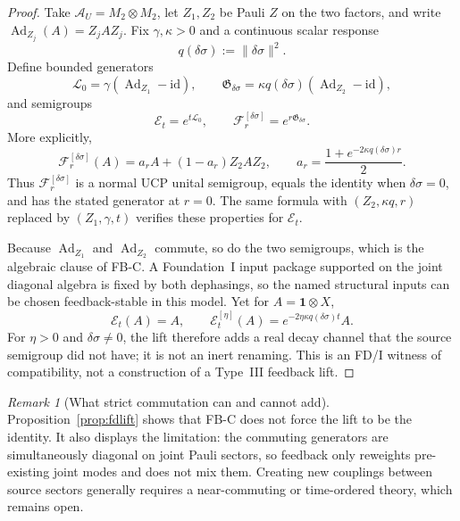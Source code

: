 \documentclass[12pt]{article}
\theoremstyle{definition}
\theoremstyle{remark}
\newtheorem{remark}[theorem]{Remark}
\begin{document}
\begin{proof}
Take \(\mathcal A_U=M_2\otimes M_2\), let \(Z_1,Z_2\) be Pauli \(Z\) on
the two factors, and write \(\operatorname{Ad}_{Z_j}(A)=Z_jAZ_j\). Fix
\(\gamma,\kappa>0\) and a continuous scalar response
\[
q(\delta\sigma):=\|\delta\sigma\|^2.
\]
Define bounded generators
\[
\mathcal L_0=\gamma(\operatorname{Ad}_{Z_1}-\mathrm{id}),
\qquad
\mathfrak G_{\delta\sigma}
=\kappa q(\delta\sigma)
(\operatorname{Ad}_{Z_2}-\mathrm{id}),
\]
and semigroups
\[
\mathcal E_t=e^{t\mathcal L_0},
\qquad
\mathscr F_r^{[\delta\sigma]}=e^{r\mathfrak G_{\delta\sigma}}.
\]
More explicitly,
\[
\mathscr F_r^{[\delta\sigma]}(A)
=a_r A+(1-a_r)Z_2AZ_2,
\qquad
a_r=\frac{1+e^{-2\kappa q(\delta\sigma)r}}{2}.
\]
Thus \(\mathscr F_r^{[\delta\sigma]}\) is a normal UCP unital
semigroup, equals the identity when \(\delta\sigma=0\), and has the
stated generator at \(r=0\). The same formula with
\((Z_2,\kappa q,r)\) replaced by \((Z_1,\gamma,t)\) verifies these
properties for \(\mathcal E_t\).

Because \(\operatorname{Ad}_{Z_1}\) and
\(\operatorname{Ad}_{Z_2}\) commute, so do the two semigroups, which is
the algebraic clause of FB-C. A Foundation~I input package supported on
the joint diagonal algebra is fixed by both dephasings, so the named
structural inputs can be chosen feedback-stable in this model. Yet for
\(A=\mathbf1\otimes X\),
\[
\mathcal E_t(A)=A,
\qquad
\mathcal E_t^{[\eta]}(A)
=e^{-2\eta\kappa q(\delta\sigma)t}A.
\]
For \(\eta>0\) and \(\delta\sigma\ne0\), the lift therefore adds a real
decay channel that the source semigroup did not have; it is not an inert
renaming. This is an FD/I witness of compatibility, not a construction
of a Type~III feedback lift.
\end{proof}

\begin{remark}[What strict commutation can and cannot add]
Proposition~\ref{prop:fdlift} shows that FB-C does not force the lift to
be the identity. It also displays the limitation: the commuting
generators are simultaneously diagonal on joint Pauli sectors, so
feedback only reweights pre-existing joint modes and does not mix them.
Creating new couplings between source sectors generally requires a
near-commuting or time-ordered theory, which remains open.
\end{remark}
\end{document}
